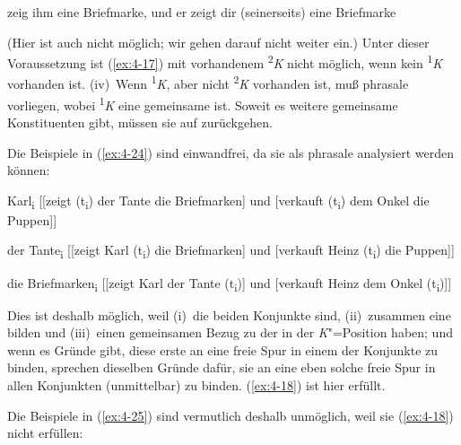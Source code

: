 \documentclass[output=paper]{langsci/langscibook}
\begin{document}
\begin{exe}
\ex%
\label{ex:4-23}
zeig ihm eine Briefmarke, und er zeigt dir (seinerseits) eine Briefmarke
\end{exe}
(Hier ist auch  nicht möglich; wir gehen darauf nicht weiter ein.) Unter dieser Voraussetzung ist (\ref{ex:4-17}) mit vorhandenem \textsuperscript{2}\textit{K} nicht möglich, wenn kein \textsuperscript{1}\textit{K} vorhanden ist. (iv)~Wenn \textsuperscript{1}\textit{K}, aber nicht \textsuperscript{2}\textit{K} vorhanden ist, muß phrasale  vorliegen, wobei \textsuperscript{1}\textit{K} eine gemeinsame  ist. Soweit es weitere gemeinsame Konstituenten gibt, müssen sie auf  zurückgehen.

Die Beispiele in (\ref{ex:4-24}) sind einwandfrei, da sie als phrasale  analysiert werden können:


\begin{exe}
\ex
\label{ex:4-24}
\begin{xlist}
\ex%
\label{ex:4-24a}
Karl\textsubscript{i} [[zeigt (t\textsubscript{i}) der Tante die Briefmarken] und [verkauft (t\textsubscript{i}) dem Onkel die Puppen]]

\ex%
\label{ex:4-24b}
der Tante\textsubscript{i }[[zeigt Karl (t\textsubscript{i}) die Briefmarken] und [verkauft Heinz (t\textsubscript{i}) die Puppen]]

\ex%
\label{ex:4-24c}
die Briefmarken\textsubscript{i }[[zeigt Karl der Tante (t\textsubscript{i})] und [verkauft Heinz dem Onkel (t\textsubscript{i})]]
\end{xlist}
\end{exe}
Dies ist deshalb möglich, weil (i)~die beiden Konjunkte  sind, (ii)~zusammen eine  bilden und (iii)~einen gemeinsamen Bezug zu der  in der \textit{K}{}"=Position haben; und wenn es Gründe gibt, diese erste  an eine freie Spur in einem der Konjunkte zu binden, sprechen dieselben Gründe dafür, sie an eine eben solche freie Spur in allen Konjunkten (unmittelbar) zu binden. (\ref{ex:4-18}) ist hier erfüllt.

Die Beispiele in (\ref{ex:4-25}) sind vermutlich deshalb unmöglich, weil sie (\ref{ex:4-18}) nicht erfüllen:
\end{document}
